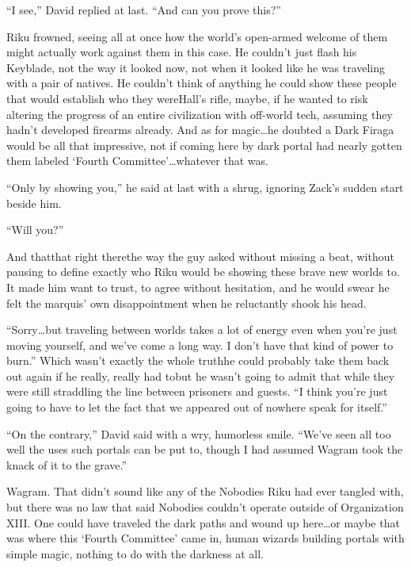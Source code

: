 ``I see,'' David replied at last. ``And can you prove this?''

Riku frowned, seeing all at once how the world's open-armed welcome of them might actually work against them in this case. He couldn't just flash his Keyblade, not the way it looked now, not when it looked like he was traveling with a pair of natives. He couldn't think of anything he could show these people that would establish who they were\textemdash Hall's rifle, maybe, if he wanted to risk altering the progress of an entire civilization with off-world tech, assuming they hadn't developed firearms already. And as for magic\ldots he doubted a Dark Firaga would be all that impressive, not if coming here by dark portal had nearly gotten them labeled `Fourth Committee'\ldots whatever that was.

``Only by showing you,'' he said at last with a shrug, ignoring Zack's sudden start beside him.

``Will you?''

And that\textemdash that right there\textemdash the way the guy asked without missing a beat, without pausing to define exactly who Riku would be showing these brave new worlds to. It made him want to trust, to agree without hesitation, and he would swear he felt the marquis' own disappointment when he reluctantly shook his head.

``Sorry\ldots but traveling between worlds takes a lot of energy even when you're just moving yourself, and we've come a long way. I don't have that kind of power to burn.'' Which wasn't exactly the whole truth\textemdash he could probably take them back out again if he really, really had to\textemdash but he wasn't going to admit that while they were still straddling the line between prisoners and guests. ``I think you're just going to have to let the fact that we appeared out of nowhere speak for itself.''

``On the contrary,'' David said with a wry, humorless smile. ``We've seen all too well the uses such portals can be put to, though I had assumed Wagram took the knack of it to the grave.''

Wagram. That didn't sound like any of the Nobodies Riku had ever tangled with, but there was no law that said Nobodies couldn't operate outside of Organization XIII. One could have traveled the dark paths and wound up here\ldots or maybe that was where this `Fourth Committee' came in, human wizards building portals with simple magic, nothing to do with the darkness at all.

